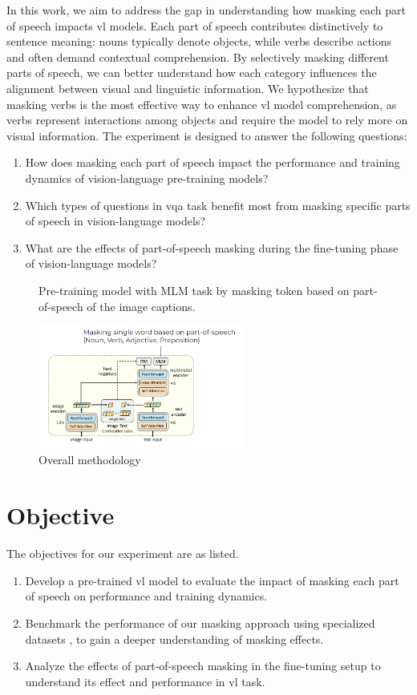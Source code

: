 In this work, we aim to address the gap in understanding how masking each part of speech impacts \acrshort{vl} models.
Each part of speech contributes distinctively to sentence meaning: nouns typically denote objects, while verbs describe actions and often demand contextual comprehension.
By selectively masking different parts of speech, we can better understand how each category influences the alignment between visual and linguistic information.
We hypothesize that masking verbs is the most effective way to enhance \acrshort{vl} model comprehension, as verbs represent interactions among objects and require the model to rely more on visual information.
The experiment is designed to answer the following questions:
\begin{enumerate}
    \item How does masking each part of speech impact the performance and training dynamics of vision-language pre-training models?
    \item Which types of questions in \acrfull{vqa} task benefit most from masking specific parts of speech in vision-language models?
    \item What are the effects of part-of-speech masking during the fine-tuning phase of vision-language models?
\end{enumerate}

\begin{figure}[h]
    \caption{Overall methodology}
    \label{fig:overview}
    Pre-training model with MLM task by masking token based on part-of-speech of the image captions.
    \begin{center}
        \includegraphics[width=0.6\textwidth]{Images/overview.png}
    \end{center}
    \small
\end{figure}

\section{Objective}
The objectives for our experiment are as listed.
\begin{enumerate}
    \item Develop a pre-trained \acrshort{vl} model to evaluate the impact of masking each part of speech on performance and training dynamics.
    \item Benchmark the performance of our masking approach using specialized datasets \cite{valse, foil-dataset}, to gain a deeper understanding of masking effects.
    \item Analyze the effects of part-of-speech masking in the fine-tuning setup to understand its effect and performance in \acrshort{vl} task.
\end{enumerate}

